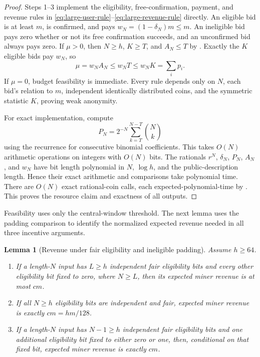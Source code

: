 \documentclass[11pt]{article}
\newtheorem{lemma}{Lemma}[section]
\begin{document}
\begin{proof}
Steps 1--3 implement the eligibility, free-confirmation, payment, and revenue
rules in \eqref{eq:large-user-rule}--\eqref{eq:large-revenue-rule} directly.
An eligible bid is at least $m$, is confirmed, and pays
$w_N=(1-\delta_N)m\le m$.  An ineligible bid pays zero whether or not its free
confirmation succeeds, and an unconfirmed bid always pays zero.  If $\mu>0$,
then $N\ge h$, $K\ge T$, and $A_N\le T$ by
.  Exactly the $K$ eligible bids pay $w_N$, so
\[
\mu=w_NA_N\le w_NT\le w_NK=\sum_i p_i.
\]
If $\mu=0$, budget feasibility is immediate.  Every rule depends only on
$N$, each bid's relation to $m$, independent identically distributed coins,
and the symmetric statistic $K$, proving weak anonymity.

For exact implementation, compute
\[
P_N=2^{-N}\sum_{k=T}^{N-T}\binom Nk
\]
using the recurrence for consecutive binomial coefficients.  This takes
$O(N)$ arithmetic operations on integers with $O(N)$ bits.  The rationals
$r^N$, $\delta_N$, $P_N$, $A_N$, and $w_N$ have bit length polynomial in
$N$, $\log h$, and the public-description length.  Hence their exact
arithmetic and comparisons take polynomial time.  There are $O(N)$ exact
rational-coin calls, each expected-polynomial-time by
.  This proves the resource claim and exactness of all
outputs.
\end{proof}

Feasibility uses only the central-window threshold.  The next lemma uses the
padding comparison to identify the normalized expected revenue needed in all
three incentive arguments.

\begin{lemma}[Revenue under fair eligibility and ineligible padding]
\label{lem:large-revenue}
Assume $h\ge64$.
\begin{enumerate}
  \item If a length-$N$ input has $L\ge h$ independent fair eligibility bits
  and every other eligibility bit fixed to zero, where $N\ge L$, then its
  expected miner revenue is at most $cm$.
  \item If all $N\ge h$ eligibility bits are independent and fair, expected
  miner revenue is exactly $cm=hm/128$.
  \item If a length-$N$ input has $N-1\ge h$ independent fair eligibility
  bits and one additional eligibility bit fixed to either zero or one, then,
  conditional on that fixed bit, expected miner revenue is exactly $cm$.
\end{enumerate}
\end{lemma}
\end{document}
